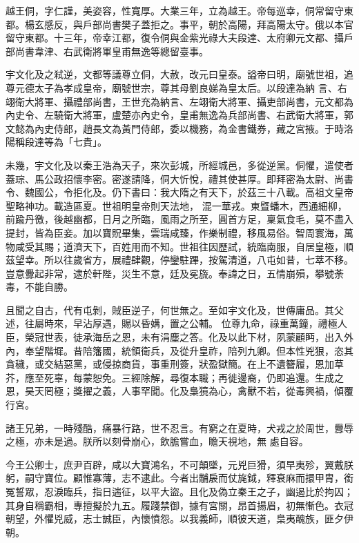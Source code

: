 \begin{pinyinscope}
 越王侗，字仁謹，美姿容，性寬厚。大業三年，立為越王。帝每巡幸，侗常留守東都。楊玄感反，與戶部尚書樊子蓋拒之。事平，朝於高陽，拜高陽太守。俄以本官留守東都。十三年，帝幸江都，復令侗與金紫光祿大夫段達、太府卿元文都、攝戶部尚書韋津、右武衛將軍皇甫無逸等總留臺事。



 宇文化及之弒逆，文都等議尊立侗，大赦，改元曰皇泰。謚帝曰明，廟號世祖，追尊元德太子為孝成皇帝，廟號世宗，尊其母劉良娣為皇太后。以段達為納
 言、右翊衛大將軍、攝禮部尚書，王世充為納言、左翊衛大將軍、攝吏部尚書，元文都為內史令、左驍衛大將軍，盧楚亦內史令，皇甫無逸為兵部尚書、右武衛大將軍，郭文懿為內史侍郎，趙長文為黃門侍郎，委以機務，為金書鐵券，藏之宮掖。于時洛陽稱段達等為「七貴」。



 未幾，宇文化及以秦王浩為天子，來次彭城，所經城邑，多從逆黨。侗懼，遣使者蓋琮、馬公政招懷李密。密遂請降，侗大忻悅，禮其使甚厚。即拜密為太尉、尚書令、魏國公，令拒化及。仍下書曰：我大隋之有天下，於茲三十八載。高祖文皇帝聖略神功。載造區夏。世祖明皇帝則天法地，
 混一華戎。東暨蟠木，西通細柳，前踰丹徼，後越幽都，日月之所臨，風雨之所至，圓首方足，稟氣食毛，莫不盡入提封，皆為臣妾。加以寶貺畢集，雲瑞咸臻，作樂制禮，移風易俗。智周寰海，萬物咸受其賜；道濟天下，百姓用而不知。世祖往因歷試，統臨南服，自居皇極，順茲望幸。所以往歲省方，展禮肆觀，停鑾駐蹕，按駕清道，八屯如昔，七萃不移。豈意釁起非常，逮於軒陛，災生不意，廷及冕旒。奉諱之日，五情崩殞，攀號荼毒，不能自勝。



 且聞之自古，代有屯剝，賊臣逆子，何世無之。至如宇文化及，世傳庸品。其父述，往屬時來，早沾厚遇，賜以昏媾，置之公輔。
 位尊九命，祿重萬鐘，禮極人臣，榮冠世表，徒承海岳之恩，未有涓塵之答。化及以此下材，夙蒙顧眄，出入外內，奉望階墀。昔陪籓國，統領衛兵，及從升皇祚，陪列九卿。但本性兇狠，恣其貪穢，或交結惡黨，或侵掠商貨，事重刑簽，狀盈獄簡。在上不遺簪履，恩加草芥，應至死辜，每蒙恕免。三經除解，尋復本職；再徙邊裔，仍即追還。生成之恩，昊天罔極；獎擢之義，人事罕聞。化及梟獍為心，禽獸不若，從毒興禍，傾覆行宮。



 諸王兄弟，一時殘酷，痛暴行路，世不忍言。有窮之在夏時，犬戎之於周世，釁辱之極，亦未是過。朕所以刻骨崩心，飲膽嘗血，瞻天視地，無
 處自容。



 今王公卿士，庶尹百辟，咸以大寶鴻名，不可顛墜，元兇巨猾，須早夷殄，翼戴朕躬，嗣守寶位。顧惟寡薄，志不逮此。今者出黼扆而仗旄鉞，釋衰麻而擐甲胄，銜冤誓眾，忍淚臨兵，指日遄征，以平大盜。且化及偽立秦王之子，幽遏比於拘囚；其身自稱霸相，專擅擬於九五。履踐禁御，據有宮關，昂首揚眉，初無慚色。衣冠朝望，外懼兇威，志士誠臣，內懷憤怨。以我義師，順彼天道，梟夷醜族，匪夕伊朝。




\end{pinyinscope}
